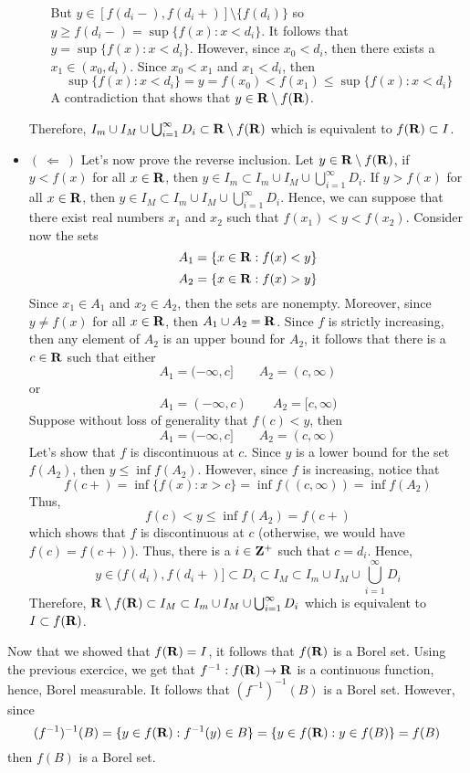 \begin{solution}
\begin{itemize}
\begin{itemize}
            But $y \in [f(d_i -), f(d_i + )] \setminus \{f(d_i)\}$ so $y \geq f(d_i-) = \sup \{f(x) : x < d_i\}$. It follows that $y = \sup \{f(x) : x < d_i\}$. However, since $x_0 < d_i$, then there exists a $x_1 \in (x_0, d_i)$. Since $x_0 <x_1$ and $x_1 < d_i$, then 
            $$\sup \{f(x) : x < d_i\} = y = f(x_0) < f(x_1) \leq \sup \{f(x) : x < d_i\}$$
            A contradiction that shows that $y \in \mathbf{R} \setminus f(\mathbf{R})$.
        \end{itemize}
        Therefore, $I_m \cup I_M \cup \bigcup_{i=1}^{\infty}D_i \subset \mathbf{R} \setminus f(\mathbf{R})$ which is equivalent to $f(\mathbf{R}) \subset I$.
        \item $( \ \Longleftarrow \ )$ Let's now prove the reverse inclusion. Let $y \in \mathbf{R} \setminus f(\mathbf{R})$, if $y < f(x)$ for all $x \in \mathbf{R}$, then $y \in I_m \subset I_m \cup I_M \cup \bigcup_{i=1}^{\infty}D_i$. If $y > f(x)$ for all $x \in \mathbf{R}$, then $y \in I_M \subset I_m \cup I_M \cup \bigcup_{i=1}^{\infty}D_i$. Hence, we can suppose that there exist real numbers $x_1$ and $x_2$ such that $f(x_1) < y < f(x_2)$. Consider now the sets
        $$A_1 = \{x \in \mathbf{R} : f(x) < y\}$$
        $$A_2 = \{x \in \mathbf{R} : f(x) > y\}$$
        Since $x_1 \in A_1$ and $x_2 \in A_2$, then the sets are nonempty. Moreover, since $y \neq f(x)$ for all $x \in \mathbf{R}$, then $A_1 \cup A_2 = \mathbf{R}$. Since $f$ is strictly increasing, then any element of $A_2$ is an upper bound for $A_2$, it follows that there is a $c \in \mathbf{R}$ such that either
        $$A_1 = (-\infty, c] \qquad A_2 = (c, \infty)$$
        or 
        $$A_1 = (-\infty, c)\qquad A_2 = [c, \infty)$$
        Suppose without loss of generality that $f(c) < y$, then 
        $$A_1 = (-\infty, c] \qquad A_2 = (c, \infty)$$
        Let's show that $f$ is discontinuous at $c$. Since $y$ is a lower bound for the set $f(A_2)$, then $y \leq \inf f(A_2)$. However, since $f$ is increasing, notice that
        $$f(c+) = \inf \{f(x) : x > c\} = \inf f((c, \infty)) = \inf f(A_2)$$
        Thus,
        $$f(c) < y \leq \inf f(A_2) = f(c+)$$
        which shows that $f$ is discontinuous at $c$ (otherwise, we would have $f(c) = f(c+)$). Thus, there is a $i \in \mathbf{Z}^+$ such that $c = d_i$. Hence, 
        $$y \in (f(d_i), f(d_i+)] \subset D_i \subset I_M \subset I_m \cup I_M \cup \bigcup_{i=1}^{\infty}D_i$$
        Therefore, $\mathbf{R} \setminus f(\mathbf{R}) \subset I_M \subset I_m \cup I_M \cup \bigcup_{i=1}^{\infty}D_i$ which is equivalent to $I \subset f(\mathbf{R})$.
    \end{itemize}
    Now that we showed that $f(\mathbf{R}) = I$, it follows that $f(\mathbf{R})$ is a Borel set. Using the previous exercice, we get that $f^{-1} : f(\mathbf{R}) \to \mathbf{R}$ is a continuous function, hence, Borel measurable. It follows that $(f^{-1})^{-1}(B)$ is a Borel set. However, since
    $$(f^{-1})^{-1}(B) = \{y \in f(\mathbf{R}) : f^{-1}(y) \in B\} = \{y \in f(\mathbf{R}) : y \in f(B)\} = f(B)$$
    then $f(B)$ is a Borel set. \\
\end{solution}

